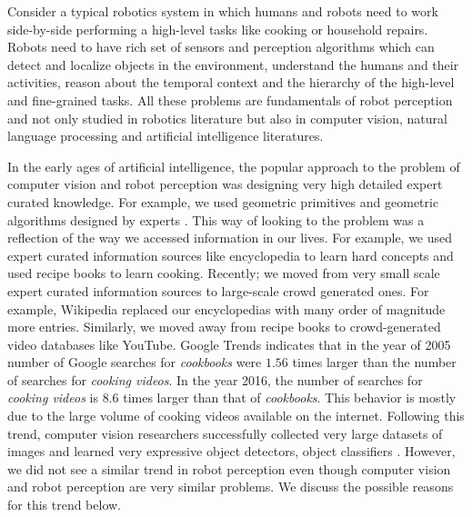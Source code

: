 

Consider a typical robotics system in which humans and robots need to work side-by-side performing a high-level tasks like cooking or household repairs. Robots need to have rich set of sensors and perception algorithms which can detect and localize objects in the environment, understand the humans and their activities, reason about the temporal context and the hierarchy of the high-level and fine-grained tasks. All these problems are fundamentals of robot perception and not only studied in robotics literature but also in computer vision, natural language processing and artificial intelligence literatures.




\todo{}

In the early ages of artificial intelligence, the popular approach to the problem of computer vision and robot perception was designing very high detailed expert curated knowledge. For example, we used geometric primitives and geometric algorithms designed by experts \cite{cylinder}. 
This way of looking to the problem was a reflection of the way we accessed information in our lives. For example, we used expert curated information sources like encyclopedia to learn hard concepts and used recipe books to learn cooking. Recently; we moved from very small scale expert curated information sources to large-scale crowd generated ones. For example, Wikipedia replaced our encyclopedias with many order of magnitude more entries. Similarly, we moved away from recipe books to crowd-generated video databases like YouTube\cite{youtube}. Google Trends\cite{google_trends} indicates that in the year of 2005 number of Google searches for \emph{cookbooks} were $1.56$ times larger than the number of searches for \emph{cooking videos}. In the year 2016, the number of searches for \emph{cooking videos} is $8.6$ times larger than that of \emph{cookbooks}. This behavior is mostly due to the large volume of cooking videos available on the internet. Following this trend, computer vision researchers successfully collected very large datasets of images and learned very expressive object detectors\cite{rcnn}, object classifiers \cite{alexnet,vggnet,googlenet,residual}. However, we did not see a similar trend in robot perception even though computer vision and robot perception are very similar problems. We discuss the possible reasons for this trend below.

